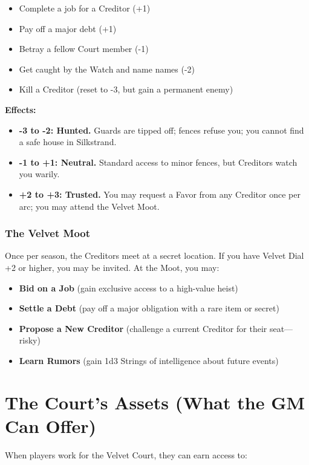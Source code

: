 \documentclass[10pt,twoside]{book}
\begin{document}
\begin{itemize}
\item Complete a job for a Creditor (+1)
\item Pay off a major debt (+1)
\item Betray a fellow Court member (-1)
\item Get caught by the Watch and name names (-2)
\item Kill a Creditor (reset to -3, but gain a permanent enemy)
\end{itemize}

\textbf{Effects:}
\begin{itemize}
\item \textbf{-3 to -2: Hunted.} Guards are tipped off; fences refuse you; you cannot find a safe house in Silkstrand.
\item \textbf{-1 to +1: Neutral.} Standard access to minor fences, but Creditors watch you warily.
\item \textbf{+2 to +3: Trusted.} You may request a Favor from any Creditor once per arc; you may attend the Velvet Moot.
\end{itemize}

\subsection{The Velvet Moot}

Once per season, the Creditors meet at a secret location. If you have Velvet Dial +2 or higher, you may be invited. At the Moot, you may:

\begin{itemize}
\item \textbf{Bid on a Job} (gain exclusive access to a high-value heist)
\item \textbf{Settle a Debt} (pay off a major obligation with a rare item or secret)
\item \textbf{Propose a New Creditor} (challenge a current Creditor for their seat---risky)
\item \textbf{Learn Rumors} (gain 1d3 Strings of intelligence about future events)
\end{itemize}

\chapter{The Court's Assets (What the GM Can Offer)}

When players work for the Velvet Court, they can earn access to:
\end{document}
